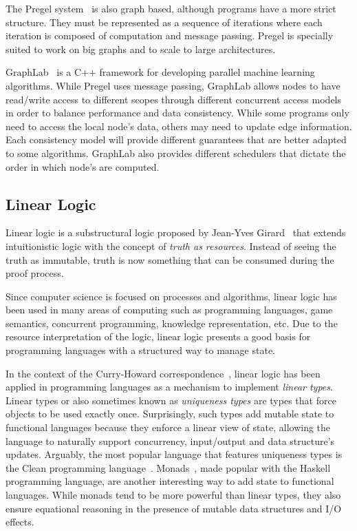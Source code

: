 The Pregel system~\cite{Malewicz:2010:PSL:1807167.1807184} is also graph based, although programs have a more strict
structure. They must be represented as a sequence of iterations where each iteration is composed of computation and message passing.
Pregel is specially suited to work on big graphs and to scale to large architectures.

GraphLab~\cite{GraphLab2010} is a C++ framework for developing parallel machine learning
algorithms. While Pregel uses message passing, GraphLab allows nodes to have read/write
access to different scopes through different concurrent access models in order to balance
performance and data consistency. While some programs only need to access the local node's
data, others may need to update edge information. Each consistency model will provide different
guarantees that are better adapted to some algorithms. GraphLab also provides different
schedulers that dictate the order in which node's are computed.

\subsection{Linear Logic}

Linear logic is a substructural logic proposed by Jean-Yves Girard~\cite{Girard95logic:its} that extends intuitionistic logic with the concept of \emph{truth as resources}. Instead of seeing the truth as immutable, truth is now something that can be consumed during the proof process.

Since computer science is focused on processes and algorithms, linear logic has been used
in many areas of computing such as programming languages, game semantics, concurrent programming, knowledge representation, etc.
Due to the resource interpretation of the logic, linear logic presents a good basis for programming
languages with a structured way to manage state.

In the context of the Curry-Howard correspondence~\cite{howard:tfatnoc}, linear logic has been applied in programming languages
as a mechanism to implement \emph{linear types}. Linear types or also sometimes known as \emph{uniqueness types} are types
that force objects to be used exactly once. Surprisingly, such types add mutable state to functional languages because they enforce
a linear view of state, allowing the language to naturally support concurrency, input/output and data structure's updates.
Arguably, the most popular language that features uniqueness types is the Clean programming language~\cite{JFP:1349748}.
Monads~\cite{Wadler:1997:DI:262009.262011}, made popular with the Haskell programming language, are another interesting way to add state
to functional languages. While monads tend to be more powerful than linear types, they also ensure equational reasoning in the presence
of mutable data structures and I/O effects.

